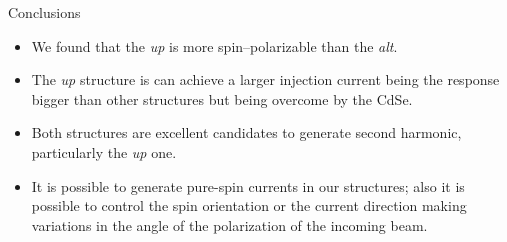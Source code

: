 \documentclass{beamer}
\begin{document}
\begin{frame}


{\Large Conclusions}
{\small

\begin{itemize}

\item 
We found that the \emph{up} is more spin--polarizable than the \emph{alt}.

\item 
The \emph{up} structure is can achieve a larger injection current being the
response bigger than other structures but being overcome by the CdSe.

\item 
Both structures are excellent candidates to generate second harmonic,
particularly the \emph{up} one.

\item 
It is possible to generate pure-spin currents in our structures; also it is
possible to control the spin orientation or the current direction making
variations in the angle of the polarization of the incoming beam.

\end{itemize}
}

\end{frame}






    




\end{document}
